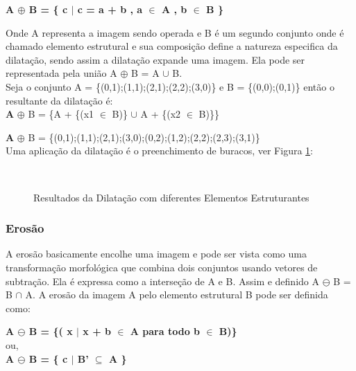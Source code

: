 \documentclass[letterpaper, 10 pt, conference]{ieeeconf}  %
\begin{document}
\begin{center}
\textbf {A $\oplus$ B = \{ c $\mid$ c = a + b , a $\in$ A , b $\in$ B \}} \\
\end{center}

Onde A representa a imagem sendo operada e B é um segundo conjunto onde é chamado elemento estrutural e sua composição define a natureza especifica da dilatação, sendo assim a dilatação expande uma imagem. Ela pode ser representada pela união A $\oplus$ B = A $\cup$ B.\\

Seja o conjunto A = \{(0,1);(1,1);(2,1);(2,2);(3,0)\} e B = \{(0,0);(0,1)\} então o resultante da dilatação é:\\

\textbf A $\oplus$ B = \{A + \{(x1 $\in$ B)\} $\cup$ A + \{(x2 $\in$ B)\}\}

\textbf A $\oplus$ B = \{(0,1);(1,1);(2,1);(3,0);(0,2);(1,2);(2,2);(2,3);(3,1)\}\\

Uma aplicação da dilatação é o preenchimento de buracos, ver Figura \ref{fig:Figura01}:

\begin{figure}[H]
\centering

\\


\caption{Resultados da Dilatação com diferentes Elementos Estruturantes}
\label{fig:Figura01}
\end{figure}

\subsubsection{Erosão}

A erosão basicamente encolhe uma imagem e pode ser vista como uma transformação morfológica que combina dois conjuntos usando vetores de subtração. Ela é expressa como a interseção de A e B. Assim e definido A $\ominus$ B = B $\cap$ A. A erosão da imagem A pelo elemento estrutural B pode ser definida como:

\begin{center}

\textbf {A $\ominus$ B = \{( x $\mid$ x + b $\in$ A para todo b $\in$ B)\}}\\

ou,\\

\textbf { A $\ominus$  B = \{ c $\mid$  B’ $\subseteq $ A \} }

\end{center}
\end{document}
